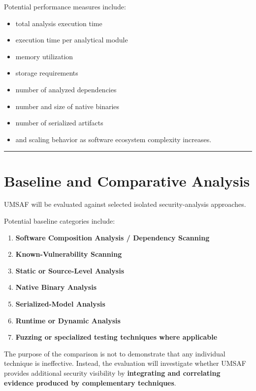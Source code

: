 \documentclass[
  12pt,
  letterpaper,
  oneside]{report}
\providecommand{\tightlist}{%
  \setlength{\itemsep}{0pt}\setlength{\parskip}{0pt}}
\begin{document}
Potential performance measures include:

\begin{itemize}
\tightlist
\item
  total analysis execution time
\item
  execution time per analytical module
\item
  memory utilization
\item
  storage requirements
\item
  number of analyzed dependencies
\item
  number and size of native binaries
\item
  number of serialized artifacts
\item
  and scaling behavior as software ecosystem complexity increases.
\end{itemize}

\begin{center}\rule{0.5\linewidth}{0.5pt}\end{center}

\section{Baseline and Comparative Analysis}\label{116-baseline-and-comparative-analysis}

UMSAF will be evaluated against selected isolated security-analysis
approaches.

Potential baseline categories include:

\begin{enumerate}
\def\labelenumi{\arabic{enumi}.}
\tightlist
\item
  \textbf{Software Composition Analysis / Dependency Scanning}
\item
  \textbf{Known-Vulnerability Scanning}
\item
  \textbf{Static or Source-Level Analysis}
\item
  \textbf{Native Binary Analysis}
\item
  \textbf{Serialized-Model Analysis}
\item
  \textbf{Runtime or Dynamic Analysis}
\item
  \textbf{Fuzzing or specialized testing techniques where applicable}
\end{enumerate}

The purpose of the comparison is not to demonstrate that any individual
technique is ineffective. Instead, the evaluation will investigate
whether UMSAF provides additional security visibility by
\textbf{integrating and correlating evidence produced by complementary
techniques}.
\end{document}
